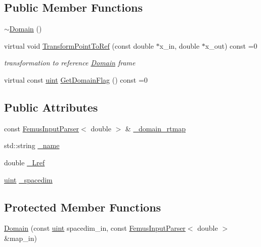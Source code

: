 \subsection*{Public Member Functions}
\begin{DoxyCompactItemize}
\item 
\mbox{\hyperlink{classfemus_1_1_domain_ad1b0f07867cc3aee73de7fba251abc50}{$\sim$\+Domain}} ()
\item 
virtual void \mbox{\hyperlink{classfemus_1_1_domain_afde27aa114c601801cc727ef9edf31de}{Transform\+Point\+To\+Ref}} (const double $\ast$x\+\_\+in, double $\ast$x\+\_\+out) const =0
\begin{DoxyCompactList}\small\item\em transformation to reference \mbox{\hyperlink{classfemus_1_1_domain}{Domain}} frame \end{DoxyCompactList}\item 
virtual const \mbox{\hyperlink{_typedefs_8hpp_a91ad9478d81a7aaf2593e8d9c3d06a14}{uint}} \mbox{\hyperlink{classfemus_1_1_domain_ad75eacc25142ba41cbceab06de675fc8}{Get\+Domain\+Flag}} () const =0
\end{DoxyCompactItemize}
\subsection*{Public Attributes}
\begin{DoxyCompactItemize}
\item 
const \mbox{\hyperlink{classfemus_1_1_femus_input_parser}{Femus\+Input\+Parser}}$<$ double $>$ \& \mbox{\hyperlink{classfemus_1_1_domain_a0cde7463658ab6de6a74ed6afedca6a0}{\+\_\+domain\+\_\+rtmap}}
\item 
std\+::string \mbox{\hyperlink{classfemus_1_1_domain_a7ed9fa5a4642690ceb7c849954b89c1f}{\+\_\+name}}
\item 
double \mbox{\hyperlink{classfemus_1_1_domain_a62bbfa8103bf9cc181d09099cb3ad839}{\+\_\+\+Lref}}
\item 
\mbox{\hyperlink{_typedefs_8hpp_a91ad9478d81a7aaf2593e8d9c3d06a14}{uint}} \mbox{\hyperlink{classfemus_1_1_domain_a940e6bd8a80fba5be0da7871703f6166}{\+\_\+spacedim}}
\end{DoxyCompactItemize}
\subsection*{Protected Member Functions}
\begin{DoxyCompactItemize}
\item 
\mbox{\hyperlink{classfemus_1_1_domain_a96de5a99af1bea80aeb1d21cea9ca362}{Domain}} (const \mbox{\hyperlink{_typedefs_8hpp_a91ad9478d81a7aaf2593e8d9c3d06a14}{uint}} spacedim\+\_\+in, const \mbox{\hyperlink{classfemus_1_1_femus_input_parser}{Femus\+Input\+Parser}}$<$ double $>$ \&map\+\_\+in)
\end{DoxyCompactItemize}


